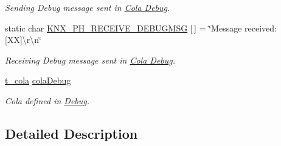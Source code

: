 \begin{DoxyCompactItemize}
\begin{DoxyCompactList}\small\item\em Sending Debug message sent in \hyperlink{group___cola___debug}{Cola Debug}. \end{DoxyCompactList}\item 
static char \hyperlink{group___k_n_x___p_h___sup___private___variables_gaaaf9f7e0d7886d2e5d3fa1680ec09a00}{K\+N\+X\+\_\+\+P\+H\+\_\+\+R\+E\+C\+E\+I\+V\+E\+\_\+\+D\+E\+B\+U\+G\+M\+SG} \mbox{[}$\,$\mbox{]} = \char`\"{}Message received\+: \mbox{[}XX\mbox{]}\textbackslash{}r\textbackslash{}n\char`\"{}\hypertarget{group___k_n_x___p_h___sup___private___variables_gaaaf9f7e0d7886d2e5d3fa1680ec09a00}{}\label{group___k_n_x___p_h___sup___private___variables_gaaaf9f7e0d7886d2e5d3fa1680ec09a00}

\begin{DoxyCompactList}\small\item\em Receiving Debug message sent in \hyperlink{group___cola___debug}{Cola Debug}. \end{DoxyCompactList}\item 
\hyperlink{structt__cola}{t\+\_\+cola} \hyperlink{group___k_n_x___p_h___sup___private___variables_ga314fd637d927bd6a2551e119de623aa5}{cola\+Debug}\hypertarget{group___k_n_x___p_h___sup___private___variables_ga314fd637d927bd6a2551e119de623aa5}{}\label{group___k_n_x___p_h___sup___private___variables_ga314fd637d927bd6a2551e119de623aa5}

\begin{DoxyCompactList}\small\item\em Cola defined in \hyperlink{group___debug}{Debug}. \end{DoxyCompactList}\end{DoxyCompactItemize}


\subsection{Detailed Description}
